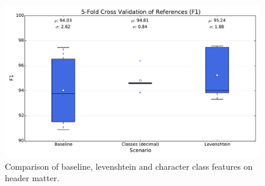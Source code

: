 \begin{figure}[h]
\center
\includegraphics[width=5.5in]{Figures/references.pdf}
\caption{Comparison of baseline, levenshtein and character class features on header matter.}
\label{fig:references}
\end{figure}
